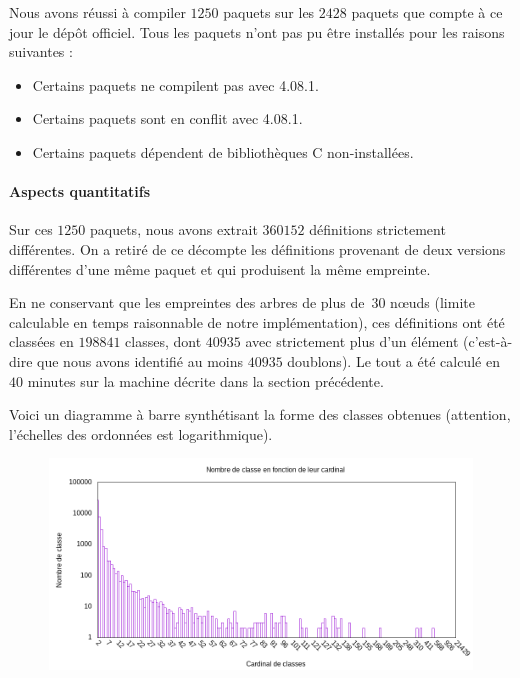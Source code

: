 Nous avons réussi à compiler $1250$ paquets sur les $2428$ paquets que
compte à ce jour le dépôt {\Opam} officiel. Tous les paquets n'ont pas
pu être installés pour les raisons suivantes :

\begin{itemize}
\item Certains paquets ne compilent pas avec {\OCaml} 4.08.1.
\item Certains paquets sont en conflit avec {\OCaml} 4.08.1.
\item Certains paquets dépendent de bibliothèques C non-installées.
\end{itemize}

\paragraph{Aspects quantitatifs}

Sur ces $1250$ paquets, nous avons extrait $360152$ définitions
strictement différentes. On a retiré de ce décompte les définitions
provenant de deux versions différentes d'une même paquet et qui
produisent la même empreinte.

En ne conservant que les empreintes des arbres de plus de~$30$ nœuds
(limite calculable en temps raisonnable de notre implémentation), ces
définitions ont été classées en $198841$ classes, dont $40935$ avec
strictement plus d'un élément (c'est-à-dire que nous avons identifié
au moins $40935$ doublons). Le tout a été calculé en $40$ minutes sur
la machine décrite dans la section précédente.

Voici un diagramme à barre synthétisant la forme des classes obtenues (attention, l'échelles des ordonnées est logarithmique).

\begin{figure}[h]
	\includegraphics[scale=0.6]{figures/bars.png}
\end{figure}

